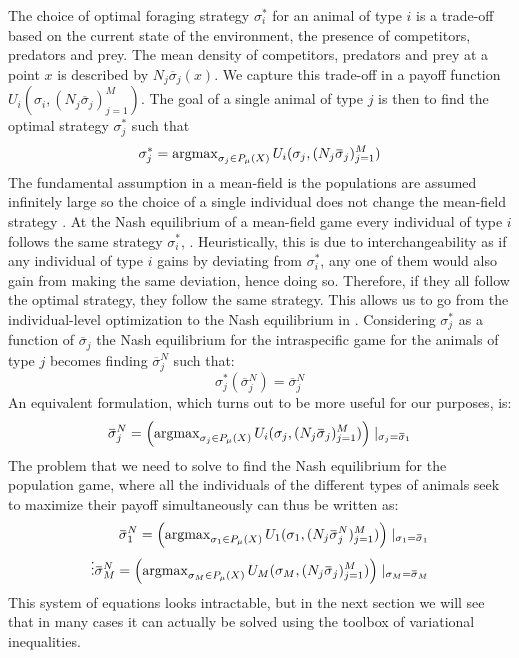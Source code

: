 The choice of optimal foraging strategy $\sigma_i^*$ for an animal of type $i$ is a trade-off based on the current state of the environment, the presence of competitors, predators and prey. The mean density of competitors, predators and prey at a point $x$ is described by $N_j \overbar{\sigma}_j(x)$. We capture this trade-off in a payoff function $U_i(\sigma_i, (N_j \overbar{\sigma}_j)_{j=1}^M)$. The goal of a single animal of type $j$ is then to find the optimal strategy $\sigma_j^*$ such that
\begin{equation}
  \label{eq:ind_opt}
  \sigma^*_j = \argmax_{\sigma_j \in P_{\mu}(X)} U_i(\sigma_j, (N_j \overbar{\sigma}_j)_{j=1}^M)
\end{equation}
The fundamental assumption in a mean-field is the populations are assumed infinitely large so the choice of a single individual does not change the mean-field strategy \citep{aumann1964markets}. At the Nash equilibrium of a mean-field game every individual of type $i$ follows the same strategy $\sigma_i^*$, \citep{lasry2007mean}. Heuristically, this is due to interchangeability as if any individual of type $i$ gains by deviating from $\sigma_i^*$, any one of them would also gain from making the same deviation, hence doing so. Therefore, if they all follow the optimal strategy, they follow the same strategy. This allows us to go from the individual-level optimization to the Nash equilibrium in . Considering $\sigma^*_{j}$ as a function of $\overbar{\sigma}_j$ the Nash equilibrium for the intraspecific game for the animals of type $j$ becomes finding $\overbar{\sigma}_j^N$ such that:
\begin{equation}
  \sigma^*_{j}(\overbar{\sigma}^N_j) = \overbar{\sigma}^N_j
\end{equation}
An equivalent formulation, which turns out to be more useful for our purposes, is:
\begin{equation}
  \label{eq:mfg_ne}
  \overbar{\sigma}_j^N = \pa{\argmax_{\sigma_j \in P_{\mu}(X)} U_i(\sigma_j, (N_j \overbar{\sigma}_j)_{j=1}^M) } \mid_{\sigma_j = \overbar{\sigma}_1}
\end{equation}
The problem that we need to solve to find the Nash equilibrium for the population game, where all the individuals of the different types of animals seek to maximize their payoff simultaneously can thus be written as:
\begin{equation}
  \label{eq:tot_nash_eq}
  \begin{split}
    \overbar{\sigma}_1^N = \pa{\argmax_{\sigma_1 \in P_{\mu}(X)} U_1(\sigma_1, (N_j \overbar{\sigma}^N_j)_{j=1}^M) } \mid_{\sigma_1 = \overbar{\sigma}_1} \\
    \vdots
    \overbar{\sigma}_M^N = \pa{\argmax_{\sigma_M \in P_{\mu}(X)} U_M(\sigma_M, (N_j \overbar{\sigma}_j)_{j=1}^M) } \mid_{\sigma_M = \overbar{\sigma}_M}
    \end{split}
\end{equation}
This system of equations looks intractable, but in the next section we will see that in many cases it can actually be solved using the toolbox of variational inequalities.

